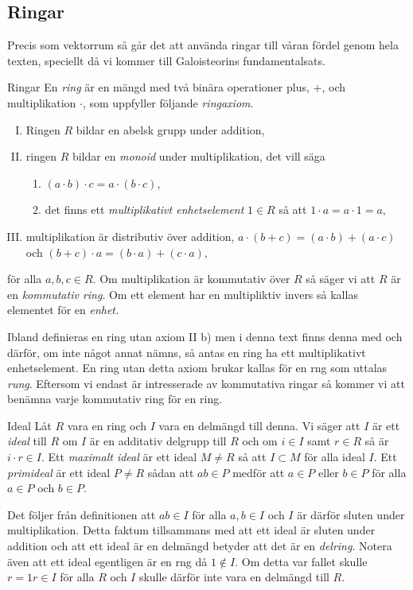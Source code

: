 \documentclass{article}
\theoremstyle{definition}
\begin{document}
\subsection{Ringar}
Precis som vektorrum så går det att använda ringar till våran fördel genom hela texten, speciellt då vi kommer till
Galoisteorins fundamentalsats.
\begin{mydef}{Ringar}{}
  En \textit{ring} är en mängd med två binära operationer plus, $+$, och multiplikation $\cdot$, som uppfyller följande \textit{ringaxiom}.
  \begin{enumerate}[I)]
    \item Ringen $R$ bildar en abelsk grupp under addition,
    \item ringen $R$ bildar en \textit{monoid} under multiplikation, det vill säga 
    \begin{enumerate}
      \item $(a \cdot b) \cdot c = a \cdot (b \cdot c)$,
      \item det finns ett \textit{multiplikativt enhetselement} $1 \in R$ så att $1 \cdot a = a \cdot 1 = a,$
    \end{enumerate}
    \item multiplikation är distributiv över addition, $a \cdot (b+c) = (a \cdot b) + (a \cdot c)$ och $(b + c) \cdot a = (b \cdot a) + (c \cdot a),$
  \end{enumerate}
  för alla $a, b, c \in R$. Om multiplikation är kommutativ över $R$ så säger vi att $R$ är en \textit{kommutativ ring}. 
  Om ett element har en multipliktiv invers så kallas elementet för en \textit{enhet.}
\end{mydef}
Ibland definieras en ring utan axiom II b) men i denna text finns denna med och därför, om inte något annat nämns, så antas en ring ha ett multiplikativt enhetselement. 
En ring utan detta axiom brukar kallas för en rng som uttalas \textit{rung}. Eftersom vi endast är intresserade av kommutativa ringar så kommer vi 
att benämna varje kommutativ ring för en ring. 

\begin{mydef}{Ideal}{}
  Låt $R$ vara en ring och $I$ vara en delmängd till denna. Vi säger att $I$ är ett \textit{ideal} till $R$ om $I$ är en additativ delgrupp till $R$
  och om $i \in I$ samt $r \in R$ så är $i \cdot r \in I$. Ett \textit{maximalt ideal} är ett ideal $M \neq R$ så att $I \subset M$ för alla 
  ideal $I$. Ett \textit{primideal} är ett ideal $P \neq R$ sådan att $ab \in P$ medför att $a \in P$ eller $b \in P$ för alla $a \in P$ och $b \in P$.
\end{mydef}
Det följer från definitionen att $ab \in I$ för alla $a, b \in I$ och $I$ är därför sluten under multiplikation. Detta faktum tillsammans 
med att ett ideal är sluten under addition och att ett ideal är en delmängd betyder att det är en \textit{delring}.
Notera även att ett ideal egentligen är en rng då $1 \notin I$. Om detta var fallet skulle 
$r = 1r \in I$ för alla $R$ och $I$ skulle därför inte vara en delmängd till $R$. 
\end{document}
